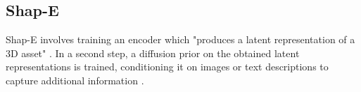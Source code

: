 \subsection{Shap-E}
\label{shap-e}

Shap-E involves training an encoder which "produces a latent representation of a 3D asset" \citep{junShapeE}. In a second step, a diffusion prior on the obtained latent representations is trained, conditioning it on images or text descriptions to capture additional information \citep{junShapeE}.